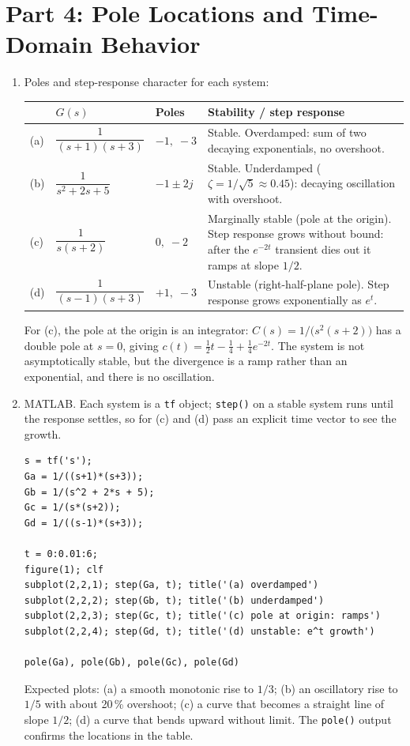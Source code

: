 \documentclass[11pt]{article}
\begin{document}
\section*{Part 4: Pole Locations and Time-Domain Behavior}

\begin{enumerate}[resume]

\item Poles and step-response character for each system:

\begin{center}
\begin{tabular}{@{}llp{2.2cm}p{8.2cm}@{}}
\toprule
 & $G(s)$ & Poles & Stability / step response \\
\midrule
(a) & $\dfrac{1}{(s+1)(s+3)}$ & $-1,\;-3$ & Stable.  Overdamped: sum of two decaying exponentials, no overshoot. \\[2ex]
(b) & $\dfrac{1}{s^2 + 2s + 5}$ & $-1 \pm 2j$ & Stable.  Underdamped ($\zeta = 1/\sqrt5 \approx 0.45$): decaying oscillation with overshoot. \\[2ex]
(c) & $\dfrac{1}{s(s+2)}$ & $0,\;-2$ & Marginally stable (pole at the origin).  Step response grows without bound: after the $e^{-2t}$ transient dies out it ramps at slope $1/2$. \\[2ex]
(d) & $\dfrac{1}{(s-1)(s+3)}$ & $+1,\;-3$ & Unstable (right-half-plane pole).  Step response grows exponentially as $e^{t}$. \\
\bottomrule
\end{tabular}
\end{center}

For (c), the pole at the origin is an integrator: $C(s) = 1/\bigl(s^2(s+2)\bigr)$ has a
double pole at $s = 0$, giving $c(t) = \tfrac12 t - \tfrac14 + \tfrac14 e^{-2t}$.
The system is not asymptotically stable, but the divergence is a ramp rather than
an exponential, and there is no oscillation.

\item MATLAB.  Each system is a \texttt{tf} object; \texttt{step()} on a
stable system runs until the response settles, so for (c) and (d) pass an
explicit time vector to see the growth.
\begin{verbatim}
s = tf('s');
Ga = 1/((s+1)*(s+3));
Gb = 1/(s^2 + 2*s + 5);
Gc = 1/(s*(s+2));
Gd = 1/((s-1)*(s+3));

t = 0:0.01:6;
figure(1); clf
subplot(2,2,1); step(Ga, t); title('(a) overdamped')
subplot(2,2,2); step(Gb, t); title('(b) underdamped')
subplot(2,2,3); step(Gc, t); title('(c) pole at origin: ramps')
subplot(2,2,4); step(Gd, t); title('(d) unstable: e^t growth')

pole(Ga), pole(Gb), pole(Gc), pole(Gd)
\end{verbatim}
Expected plots: (a) a smooth monotonic rise to $1/3$; (b) an oscillatory rise
to $1/5$ with about 20\,\% overshoot; (c) a curve that becomes a straight line
of slope $1/2$; (d) a curve that bends upward without limit.  The
\texttt{pole()} output confirms the locations in the table.

\end{enumerate}
\end{document}

